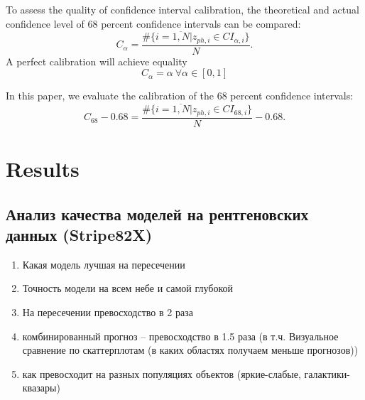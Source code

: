 \documentclass[fleqn,usenatbib]{mnras}
\begin{document}
To assess the quality of confidence interval calibration, the theoretical and actual confidence level of 68 percent confidence intervals can be compared:
\begin{equation}\label{eq:calpha}
    C_{\alpha} = \frac{\#\{i = \overline{1, N} | z_{ph,i} \in CI_{\alpha, i}\}}{N}.
\end{equation}
A perfect calibration will achieve equality
\begin{equation}\label{eq:perfect-ci}
    C_{\alpha} = \alpha ~ \forall \alpha \in [0, 1]
\end{equation}

In this paper, we evaluate the calibration of the 68 percent confidence intervals:
\begin{equation}\label{eq:c68}
    C_{68} - 0.68 = \frac{\#\{i = \overline{1, N} | z_{ph,i} \in CI_{68, i}\}}{N} - 0.68.
\end{equation}

\clearpage

\section{Results}

\subsection{Анализ качества моделей на рентгеновских данных (Stripe82X)}
\begin{enumerate}
	\item Какая модель лучшая на пересечении
	\item Точность модели на всем небе и самой глубокой
	\item На пересечении превосходство в 2 раза
	\item комбинированный прогноз -- превосходство в 1.5 раза (в т.ч. Визуальное сравнение по скаттерплотам (в каких областях получаем меньше прогнозов))
	\item как превосходит на разных популяциях объектов (яркие-слабые, галактики-квазары)
\end{enumerate}
\end{document}
